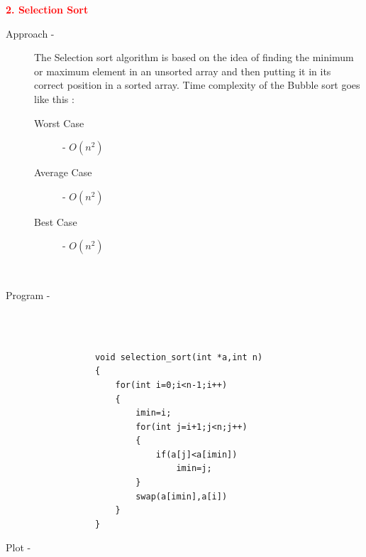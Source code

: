 \documentclass[0pt]{article}
\begin{document}
	
	
	
	
	
	
	
	
	
	
	
	
	
	
	
	
	
	
	
	
	
	
	
	
	
	
	
	
	
	
	
	
	
	
	
	
	\begin{flushleft}
		\textbf{\textcolor{red}{2. Selection Sort}}
		\leavevmode \\
		\begin{description}
			\item[Approach - ] The Selection sort algorithm is based on the idea of finding the minimum or maximum element in an unsorted array and then putting it in its correct position in a sorted array. Time complexity of the Bubble sort goes like this :  
			\leavevmode \\
			\begin{description}
				\item[Worst Case] - \(O(n^2)\)
				\item[Average Case] - \(O(n^2)\)
				\item[Best Case] - \(O(n^2)\)
			\end{description}
			\leavevmode \\
			\item[Program - ] \leavevmode \\
			\leavevmode \\
			\begin{lstlisting}
			void selection_sort(int *a,int n)
			{
				for(int i=0;i<n-1;i++)
				{
					imin=i;
					for(int j=i+1;j<n;j++)
					{
						if(a[j]<a[imin]) 
							imin=j;
					}
					swap(a[imin],a[i])
				}
			}
			\end{lstlisting}
			\item[Plot - ] \leavevmode \\
		\end{description}
	\end{flushleft}
	\begin{center}
	\end{center}
	\leavevmode \\
	
\end{document}

